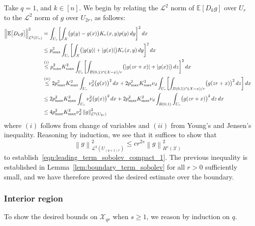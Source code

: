 \documentclass{article}
\newcommand{\abs}[1]{\left \lvert #1 \right \rvert}
\newcommand{\norm}[1]{\left \lVert #1 \right \rVert}
\newcommand{\1}{\mathbf{1}}
\newcommand{\Xset}{\mathcal{X}}
\newcommand{\Leb}{\mathcal{L}}
\newcommand{\Ebb}{\mathbb{E}}
\theoremstyle{alden}
\theoremstyle{aldenthm}
\theoremstyle{definition}
\theoremstyle{remark}
\begin{document}
Take $q = 1$, and $k \in [n]$. We begin by relating the $\Leb^2$ norm of $\Ebb[D_kg]$ over $U_r$ to the $\Leb^2$ norm of $g$ over $U_{2r}$, as follows:
\begin{align*}
\Bigl\|\Ebb\bigl[D_kg\bigr]\Bigr\|_{\Leb^2(U_r)}^2 & = \int_{U_r} \biggl[\int_{\Xset} \bigl(g(y) - g(x)\bigr)K_r(x,y) p(y) \,dy \biggr]^2 \,dx \\
& \leq p_{\max}^2 \int_{U_r} \biggl[\int_{\Xset} \bigl(\abs{g(y)} +  \abs{g(x)}\bigr)K_r(x,y) \,dy \biggr]^2 \,dx \\
& \overset{(i)}{\leq}  p_{\max}^2 K_{\max}^2 \int_{U_r} \biggl[\int_{B(0,1) \cap (\Xset - x)/r} \bigl(\abs{g(zr + x)} +  \abs{g(x)}\bigr)\,dz \biggr]^2 \,dx \\
& \overset{(ii)}{\leq} 2 p_{\max}^2 K_{\max}^2 \int_{U_r} \nu_d^2 \bigl(g(x)\bigr)^2 \,dx + 2 p_{\max}^2 K_{\max}^2 \nu_d \int_{U_r}\biggl[\int_{B(0,1) \cap (\Xset - x)/r} \bigl(g(zr + x)\bigr)^2\,dz\biggr] \,dx \\
& \leq 2 p_{\max}^2 K_{\max}^2 \int_{U_r} \nu_d^2 \bigl(g(x)\bigr)^2 \,dx + 2 p_{\max}^2 K_{\max}^2 \nu_d \int_{B(0,1)} \int_{U_r} \bigl(g(zr + x)\bigr)^2\,dz \,dx \\
& \leq 4 p_{\max}^2 K_{\max}^2 \nu_d^2 \norm{g}_{\Leb^2(U_{2r})}^2
\end{align*}
where $(i)$ follows from change of variables and $(ii)$ from Young's and Jensen's inequality. Reasoning by induction, we see that it suffices to show that
\begin{equation*}
\norm{g}_{\Leb^2(U_{(q + 1)r})}^2 \leq c r^{2s} \norm{g}_{H^s(\Xset)}^2
\end{equation*}
to establish~\eqref{eqn:leading_term_sobolev_compact_1}. The previous inequality is established in Lemma~\ref{lem:boundary_term_sobolev} for all $r > 0$ sufficiently small, and we have therefore proved the desired estimate over the boundary. 

\subsubsection{Interior region}

To show the desired bounds on $\Xset_{qr}$ when $s \geq 1$, we reason by induction on $q$.
\end{document}
